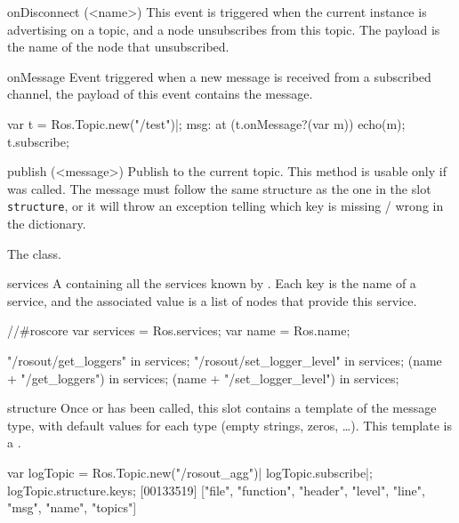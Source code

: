 \begin{urbiscriptapi}
\item[onDisconnect](<name>)%
  This event is triggered when the current instance is advertising on a
  topic, and a node unsubscribes from this topic. The payload is the name of
  the node that unsubscribed.


\item[onMessage]%
  Event triggered when a new message is received from a subscribed channel,
  the payload of this event contains the message.

\begin{urbiunchecked}
var t = Ros.Topic.new("/test")|;
msg: at (t.onMessage?(var m)) echo(m);
t.subscribe;
\end{urbiunchecked}


\item[publish](<message>)%
  Publish  to the current topic. This method is usable only if
   was called. The message must follow the same structure
  as the one in the slot \lstinline{structure}, or it will throw an
  exception telling which key is missing / wrong in the dictionary.


\item[Service]%
  The  class.


\item[services]%
  A  containing all the services known by
  . Each key is the name of a service, and the associated
  value is a list of nodes that provide this service.
\begin{urbiassert}
//#roscore
var services = Ros.services;
var name = Ros.name;

       "/rosout/get_loggers" in services;
  "/rosout/set_logger_level" in services;
     (name + "/get_loggers") in services;
(name + "/set_logger_level") in services;
\end{urbiassert}


\item[structure]%
  Once  or  has been called, this slot
  contains a template of the message type, with default values for each type
  (empty strings, zeros, \ldots).  This template is a
  .
\begin{urbiscript}
var logTopic = Ros.Topic.new("/rosout_agg")|
logTopic.subscribe|;
logTopic.structure.keys;
[00133519] ["file", "function", "header", "level", "line", "msg", "name", "topics"]
\end{urbiscript}



\end{urbiscriptapi}
